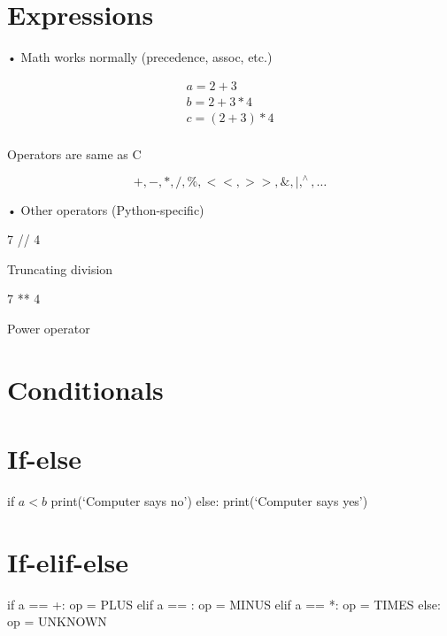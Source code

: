 \documentclass[
  letterpaper,
  DIV=11,
  numbers=noendperiod]{scrreprt}
\newenvironment{Shaded}{\begin{snugshade}}{\end{snugshade}}
\newcommand{\NormalTok}[1]{\textcolor[rgb]{0.00,0.23,0.31}{#1}}
\begin{document}

\chapter{Expressions}\label{expressions}

• Math works normally (precedence, assoc, etc.)

\[
\begin{array}{l} a = 2 + 3 \\ b = 2 + 3 * 4 \\ c = (2 + 3) * 4 \\ \end{array}
\]

Operators are same as C

\[
+, -, *, /, \%, <   <  , > >, \& , |, ^ {\wedge}, \dots
\]

• Other operators (Python-specific)

7 // 4

Truncating division

7 ** 4

Power operator


\chapter{Conditionals}\label{conditionals}


\chapter{If-else}\label{if-else}

if \(a <   b\) print(`Computer says no') else: print(`Computer says
yes')


\chapter{If-elif-else}\label{if-elif-else}

\begin{Shaded}
\begin{Highlighting}[]
\NormalTok{if a == \textquotesingle{} +\textquotesingle{}:  }
\NormalTok{    op = PLUS  }
\NormalTok{elif a == \textquotesingle{}{-}\textquotesingle{}:  }
\NormalTok{    op = MINUS  }
\NormalTok{elif a == \textquotesingle{}*\textquotesingle{}:  }
\NormalTok{    op = TIMES  }
\NormalTok{else:  }
\NormalTok{    op = UNKNOWN }
\end{Highlighting}
\end{Shaded}
\end{document}

